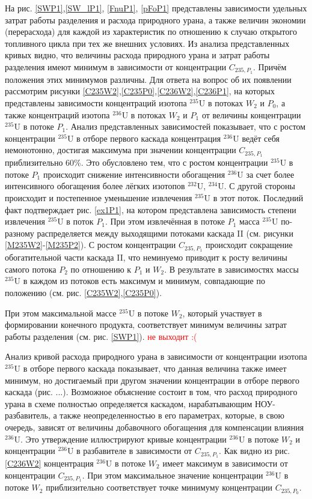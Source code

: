 На рис. \ref{SWP1},\ref{SW_lP1}, \ref{FnuP1}, \ref{pFoP1} представлены зависимости удельных затрат работы разделения и расхода природного урана, а также величин экономии (перерасхода) для каждой из характеристик по отношению к случаю открытого топливного цикла при тех же внешних условиях. Из анализа представленных кривых видно, что величины расхода природного урана и затрат работы разделения имеют минимум в зависимости от концентрации $C_{235,{P_1}}$. Причём положения этих минимумов различны. Для ответа на вопрос об их появлении рассмотрим рисунки \ref{C235W2},\ref{C235P0},\ref{C236W2},\ref{C236P1}, на которых представлены зависимости концентраций изотопа $^{235}$U в потоках $W_2$ и $P_0$, а также концентраций изотопа $^{236}$U в потоках $W_2$ и $P_1$ от величины концентрации $^{235}$U в потоке $P_1$. Анализ представленных зависимостей показывает, что с ростом концентрации $^{235}$U в отборе первого каскада концентрация $^{236}$U ведёт себя немонотонно, достигая максимума при значении концентрации $C_{235,{P_1}}$ приблизительно 60\%. Это обусловлено тем, что с ростом концентрации $^{235}$U в потоке $P_1$ происходит снижение интенсивности обогащения $^{236}$U за счет более интенсивного обогащения более лёгких изотопов $^{232}$U, $^{234}$U. С другой стороны происходит и постепенное уменьшение извлечения $^{235}$U в этот поток. Последний факт подтверждает рис. \ref{ex1P1}, на котором представлена зависимость степени извлечения $^{235}$U в поток $P_1$. При этом извлечённая в потоке $P_1$ масса $^{235}$U по-разному распределяется между выходящими потоками каскада II (см. рисунки \ref{M235W2}-\ref{M235P2}). С ростом концентрации $C_{235,{P_1}}$ происходит сокращение обогатительной части каскада II, что неминуемо приводит к росту величины самого потока $P_2$ по отношению к $P_1$ и $W_2$. В результате  в зависимостях массы $^{235}$U в каждом из потоков есть максимум и минимум, совпадающие по положению (см. рис. \ref{C235W2},\ref{C235P0}).

При этом максимальной массе $^{235}$U в потоке $W_2$, который участвует в формировании конечного продукта, соответствует минимум величины затрат работы разделения (см. рис. \ref{SWP1}). \textcolor{red}{не выходит :(}


Анализ кривой расхода природного урана в зависимости от концентрации изотопа $^{235}$U в отборе первого каскада показывает, что данная величина также имеет минимум, но достигаемый при другом значении концентрации в отборе первого каскада (рис. ...). Возможное объяснение состоит в том, что расход природного урана в схеме полностью определяется каскадом, нарабатывающим НОУ-разбавитель, а также неопределенностью в его параметрах, которые, в свою очередь, зависят от величины добавочного обогащения для компенсации влияния $^{236}$U. Это утверждение иллюстрируют кривые концентрации $^{236}$U в потоке $W_2$ и концентрации $^{236}$U в разбавителе в зависимости от $C_{235,{P_1}}$. Как видно из рис. \ref{C236W2} концентрация $^{236}$U в потоке $W_2$ имеет максимум в зависимости от концентрации $C_{235,{P_1}}$. При этом максимальное значение концентрации $^{236}$U в потоке $W_2$ приблизительно соответствует точке минимуму концентрации $C_{235,{P_0}}$. 

